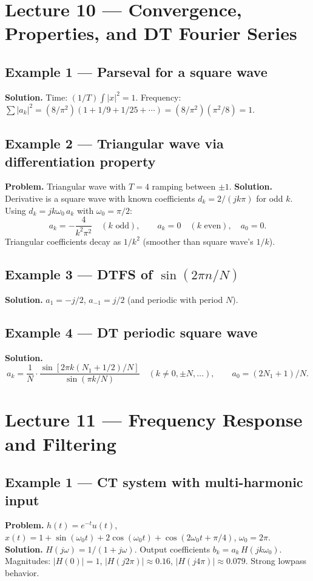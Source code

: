 \documentclass[11pt]{article}
\begin{document}
\section{Lecture 10 --- Convergence, Properties, and DT Fourier Series}

\subsection{Example 1 --- Parseval for a square wave}
\textbf{Solution.} Time: $(1/T)\int|x|^2=1$. Frequency: $\sum|a_k|^2=(8/\pi^2)(1+1/9+1/25+\cdots)=(8/\pi^2)(\pi^2/8)=1$. \checkmark

\subsection{Example 2 --- Triangular wave via differentiation property}
\textbf{Problem.} Triangular wave with $T=4$ ramping between $\pm 1$.
\textbf{Solution.} Derivative is a square wave with known coefficients $d_k=2/(jk\pi)$ for odd $k$. Using $d_k=jk\omega_0\,a_k$ with $\omega_0=\pi/2$:
\[a_k=-\frac{4}{k^2\pi^2}\quad(k\text{ odd}),\qquad a_k=0\quad(k\text{ even}),\quad a_0=0.\]
Triangular coefficients decay as $1/k^2$ (smoother than square wave's $1/k$).

\subsection{Example 3 --- DTFS of $\sin(2\pi n/N)$}
\textbf{Solution.} $a_1=-j/2$, $a_{-1}=j/2$ (and periodic with period $N$).

\subsection{Example 4 --- DT periodic square wave}
\textbf{Solution.}
\[a_k=\frac{1}{N}\cdot\frac{\sin[2\pi k(N_1+1/2)/N]}{\sin(\pi k/N)}\quad(k\ne 0,\pm N,\ldots),\qquad a_0=(2N_1+1)/N.\]

\section{Lecture 11 --- Frequency Response and Filtering}

\subsection{Example 1 --- CT system with multi-harmonic input}
\textbf{Problem.} $h(t)=e^{-t}u(t)$, $x(t)=1+\sin(\omega_0 t)+2\cos(\omega_0 t)+\cos(2\omega_0 t+\pi/4)$, $\omega_0=2\pi$.
\textbf{Solution.} $H(j\omega)=1/(1+j\omega)$. Output coefficients $b_k=a_k\,H(jk\omega_0)$. Magnitudes: $|H(0)|=1$, $|H(j2\pi)|\approx 0.16$, $|H(j4\pi)|\approx 0.079$. Strong lowpass behavior.
\end{document}

